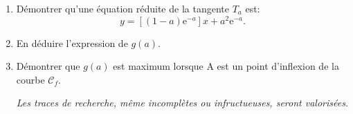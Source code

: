 \documentclass[10pt]{article}
\providecommand{\e}{{\mathrm{e}}}
\begin{document}
\begin{enumerate}
	\begin{enumerate}
		\item Démontrer qu'une équation réduite de la tangente $T_a$ est:
\[y = \left[(1- a)\e^{-a}\right]x + a^2\e^{-a}.\]
		\item En déduire l'expression de $g(a)$.
		\item Démontrer que $g(a)$ est maximum lorsque A est un point d'inflexion de la courbe $\mathcal{C}_f$.
		
\emph{Les traces de recherche, même incomplètes ou infructueuses, seront valorisées}.
	\end{enumerate}
\end{enumerate}

\bigskip
\end{document}

